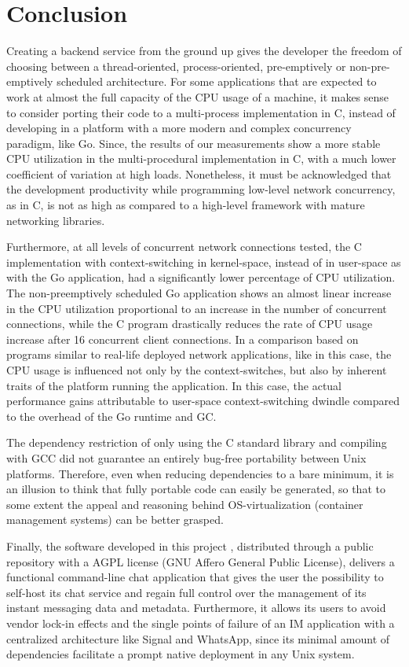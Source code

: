 \section{Conclusion}
Creating a backend service from the ground up gives the developer the freedom of choosing between a thread-oriented, process-oriented, pre-emptively or non-pre-emptively scheduled architecture. For some applications that are expected to work at almost the full capacity of the CPU usage of a machine, it makes sense to consider porting their code to a multi-process implementation in C, instead of developing in a platform with a more modern and complex concurrency paradigm, like Go. Since, the results of our measurements show a more stable CPU utilization in the multi-procedural implementation in C, with a much lower coefficient of variation at high loads.  Nonetheless, it must be acknowledged that the development productivity while programming low-level network concurrency, as in C, is not as high as compared to a high-level framework with mature networking libraries.

Furthermore, at all levels of concurrent network connections tested, the C implementation with context-switching in kernel-space, instead of in user-space as with the Go application, had a significantly lower percentage of CPU utilization. The non-preemptively scheduled Go application shows an almost linear increase in the CPU utilization proportional to an increase in the number of concurrent connections, while the C program drastically reduces the rate of CPU usage increase after 16 concurrent client connections. In a comparison based on programs similar to real-life deployed network applications, like in this case, the CPU usage is influenced not only by the context-switches, but also by inherent traits of the platform running the application. In this case, the actual performance gains attributable to user-space context-switching dwindle compared to the overhead of the Go runtime and GC.

The dependency restriction of only using the C standard library and compiling with GCC did not guarantee an entirely bug-free portability between Unix platforms. Therefore, even when reducing dependencies to a bare minimum, it is an illusion to think that fully portable code can easily be generated, so that to some extent the appeal and reasoning behind OS-virtualization (container management systems) can be better grasped.

Finally, the software developed in this project \cite{Rodriguez2022}, distributed through a public repository with a AGPL license (GNU Affero General Public License), delivers a functional command-line chat application that gives the user the possibility to self-host its chat service and regain full control over the management of its instant messaging data and metadata. Furthermore, it allows its users to avoid vendor lock-in effects and the single points of failure of an IM application with a centralized architecture like Signal and WhatsApp, since its minimal amount of dependencies facilitate a prompt native deployment in any Unix system.